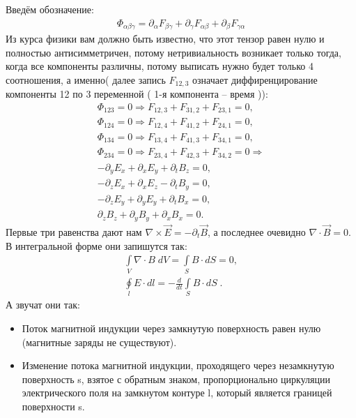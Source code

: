 \documentclass[__main__.tex]{subfiles}
\begin{document}
Введём обозначение:
\begin{gather*}
	\Phi_{\alpha\beta\gamma} = \partial_{\alpha}F_{\beta\gamma}+\partial_{\gamma}F_{\alpha\beta}+\partial_{\beta}F_{\gamma\alpha}
\end{gather*}
Из курса физики вам должно быть известно, что этот тензор равен нулю и полностью антисимметричен, потому нетривиальность возникает только тогда, когда все компоненты различны, потому выписать нужно будет только 4 соотношения, а именно( далее запись $F_{12,3}$ означает диффиренцирование компоненты 12 по 3 переменной ( 1-я компонента -- время )):
\begin{gather*}
	\Phi_{123} = 0 \Rightarrow	F_{12,3}+F_{31,2}+F_{23,1} = 0,\\
	\Phi_{124} = 0 \Rightarrow F_{12,4}+F_{41,2}+F_{24,1} = 0,\\
	\Phi_{134} = 0 \Rightarrow F_{13,4}+F_{41,3}+F_{34,1} = 0,\\
	\Phi_{234} = 0 \Rightarrow F_{23,4}+F_{42,3}+F_{34,2} = 0 \Longrightarrow \\
	-\partial_y E_x + \partial_x E_y + \partial_t B_z = 0,\\
	-\partial_z E_x + \partial_x E_z - \partial_t B_y = 0,\\
	-\partial_z E_y + \partial_y E_y + \partial_t B_x = 0,\\
	\partial_z B_z + \partial_y B_y + \partial_x B_x = 0.
\end{gather*}
Первые три равенства дают нам $\nabla\times\vec{E} = -\partial_t\vec{B}$, а последнее очевидно $\nabla\cdot\vec{B} = 0.$ В интегральной форме они запишутся так:
\begin{gather*}
\int\limits_V \nabla\cdot B\;dV = \int\limits_S B\cdot dS = 0,\\
\oint\limits_l E\cdot dl = -\frac{d}{dt}\int\limits_S B\cdot dS\;.
\end{gather*}
А звучат они так:
\begin{itemize}
	\item Поток магнитной индукции через замкнутую поверхность равен нулю (магнитные заряды не существуют).
	\item Изменение потока магнитной индукции, проходящего через незамкнутую поверхность s, взятое с обратным знаком, пропорционально циркуляции электрического поля на замкнутом контуре l, который является границей поверхности s.
\end{itemize}
\end{document}
